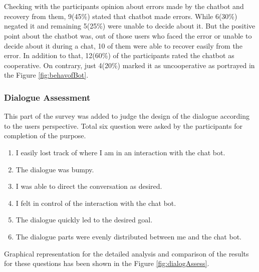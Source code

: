\\~\\
Checking with the participants opinion about errors made by the chatbot and recovery from them, 9(45\%) stated that chatbot made errors. While 6(30\%) negated it and remaining 5(25\%) were unable to decide about it. But the positive point about the chatbot was, out of those users who faced the error or unable to decide about it during a chat, 10 of them were able to recover easily from the error. In addition to that, 12(60\%) of the participants rated the chatbot as cooperative. On contrary, just 4(20\%) marked it as uncooperative as portrayed in the Figure \ref{fig:behavofBot}.


\subsubsection*{Dialogue Assessment}
This part of the survey was added to judge the design of the dialogue according to the users perspective. Total six question were asked by the participants for completion of the purpose.
\begin{enumerate}
    \item I easily lost track of where I am in an interaction with the chat bot.
    \item The dialogue was bumpy.
    \item I was able to direct the conversation as desired.
    \item I felt in control of the interaction with the chat bot.
    \item The dialogue quickly led to the desired goal.
    \item The dialogue parts were evenly distributed between me and the chat bot.
\end{enumerate}
Graphical representation for the detailed analysis and comparison of the results for these questions has been shown in the Figure \ref{fig:dialogAssess}.


